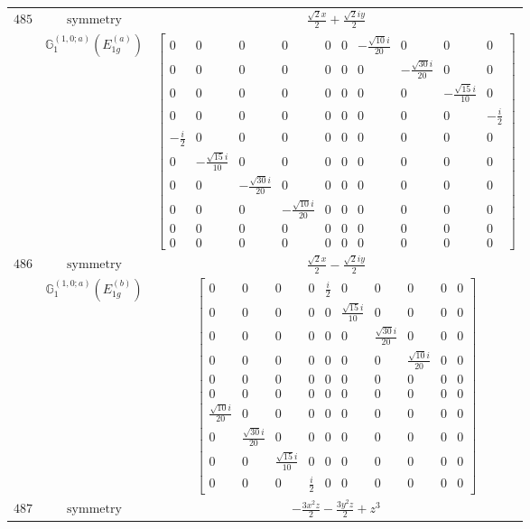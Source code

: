 \documentclass[fleqn,8pt,landscape]{jsarticle}
\begin{document}
\begin{longtable}{ccc}
$ 485 $ & $ \text{symmetry} $ & $ \frac{\sqrt{2} x}{2} + \frac{\sqrt{2} i y}{2} $ \\
$  $ & $ \mathbb{G}_{1}^{(1,0;a)}(E_{1g}^{(a)}) $ & $ \begin{bmatrix} 0 & 0 & 0 & 0 & 0 & 0 & - \frac{\sqrt{10} i}{20} & 0 & 0 & 0 \\ 0 & 0 & 0 & 0 & 0 & 0 & 0 & - \frac{\sqrt{30} i}{20} & 0 & 0 \\ 0 & 0 & 0 & 0 & 0 & 0 & 0 & 0 & - \frac{\sqrt{15} i}{10} & 0 \\ 0 & 0 & 0 & 0 & 0 & 0 & 0 & 0 & 0 & - \frac{i}{2} \\ - \frac{i}{2} & 0 & 0 & 0 & 0 & 0 & 0 & 0 & 0 & 0 \\ 0 & - \frac{\sqrt{15} i}{10} & 0 & 0 & 0 & 0 & 0 & 0 & 0 & 0 \\ 0 & 0 & - \frac{\sqrt{30} i}{20} & 0 & 0 & 0 & 0 & 0 & 0 & 0 \\ 0 & 0 & 0 & - \frac{\sqrt{10} i}{20} & 0 & 0 & 0 & 0 & 0 & 0 \\ 0 & 0 & 0 & 0 & 0 & 0 & 0 & 0 & 0 & 0 \\ 0 & 0 & 0 & 0 & 0 & 0 & 0 & 0 & 0 & 0 \end{bmatrix} $ \\ \hline
$ 486 $ & $ \text{symmetry} $ & $ \frac{\sqrt{2} x}{2} - \frac{\sqrt{2} i y}{2} $ \\
$  $ & $ \mathbb{G}_{1}^{(1,0;a)}(E_{1g}^{(b)}) $ & $ \begin{bmatrix} 0 & 0 & 0 & 0 & \frac{i}{2} & 0 & 0 & 0 & 0 & 0 \\ 0 & 0 & 0 & 0 & 0 & \frac{\sqrt{15} i}{10} & 0 & 0 & 0 & 0 \\ 0 & 0 & 0 & 0 & 0 & 0 & \frac{\sqrt{30} i}{20} & 0 & 0 & 0 \\ 0 & 0 & 0 & 0 & 0 & 0 & 0 & \frac{\sqrt{10} i}{20} & 0 & 0 \\ 0 & 0 & 0 & 0 & 0 & 0 & 0 & 0 & 0 & 0 \\ 0 & 0 & 0 & 0 & 0 & 0 & 0 & 0 & 0 & 0 \\ \frac{\sqrt{10} i}{20} & 0 & 0 & 0 & 0 & 0 & 0 & 0 & 0 & 0 \\ 0 & \frac{\sqrt{30} i}{20} & 0 & 0 & 0 & 0 & 0 & 0 & 0 & 0 \\ 0 & 0 & \frac{\sqrt{15} i}{10} & 0 & 0 & 0 & 0 & 0 & 0 & 0 \\ 0 & 0 & 0 & \frac{i}{2} & 0 & 0 & 0 & 0 & 0 & 0 \end{bmatrix} $ \\ \hline
$ 487 $ & $ \text{symmetry} $ & $ - \frac{3 x^{2} z}{2} - \frac{3 y^{2} z}{2} + z^{3} $ \\

\end{longtable}
\end{document}

